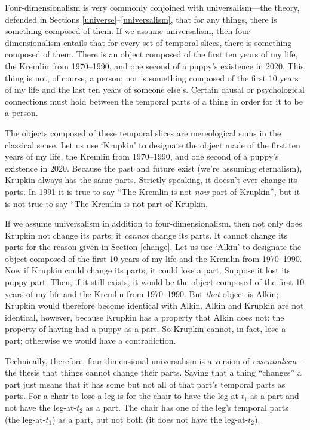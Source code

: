 \documentclass[12pt,twoside]{reedfancy}
\begin{document}
\begin{spacing}{1.25}
Four-dimensionalism is very commonly conjoined with universalism---the
theory, defended in Sections \ref{universe}--\ref{universalism}, that
for any things, there is something composed of them.  If we assume
universalism, then four-dimensionalism entails that for every set of
temporal slices, there is something composed of them.  There is an
object composed of the first ten years of my life, the Kremlin from
1970--1990, and one second of a puppy's existence in 2020.  This thing
is not, of course, a person; nor is something composed of the first 10
years of my life and the last ten years of someone else's.  Certain
causal or psychological connections must hold between the temporal
parts of a thing in order for it to be a person.

The objects composed of these temporal slices are mereological sums in
the classical sense.  Let us use `Krupkin' to designate the object
made of the first ten years of my life, the Kremlin from 1970--1990,
and one second of a puppy's existence in 2020.  Because the past and
future exist (we're assuming eternalism), Krupkin always has the same
parts.  Strictly speaking, it doesn't ever change its parts.  In 1991
it is true to say ``The Kremlin is not {\em now} part of Krupkin'',
but it is not true to say ``The Kremlin is not part of Krupkin.

If we assume universalism in addition to four-dimensionalism, then not
only does Krupkin not change its parts, it {\em cannot} change its
parts.  It cannot change its parts for the reason given in Section
\ref{change}.  Let us use `Alkin' to designate the object composed of
the first 10 years of my life and the Kremlin from 1970--1990.  Now if
Krupkin could change its parts, it could lose a part.  Suppose it lost
its puppy part.  Then, if it still exists, it would be the object
composed of the first 10 years of my life and the Kremlin from
1970--1990.  But {\em that} object is Alkin; Krupkin would therefore
become identical with Alkin.  Alkin and Krupkin are not identical,
however, because Krupkin has a property that Alkin does not: the
property of having had a puppy as a part.  So Krupkin cannot, in fact,
lose a part; otherwise we would have a contradiction.

Technically, therefore, four-dimensional universalism is a version of
{\em essentialism}---the thesis that things cannot change their parts.
Saying that a thing ``changes'' a part just means that it has some but
not all of that part's temporal parts as parts.  For a chair to lose a
leg is for the chair to have the leg-at-$t_1$ as a part and not have
the leg-at-$t_2$ as a part.  The chair has one of the leg's temporal
parts (the leg-at-$t_1$) as a part, but not both (it does not have the
leg-at-$t_2$).


\end{spacing}
\end{document}
